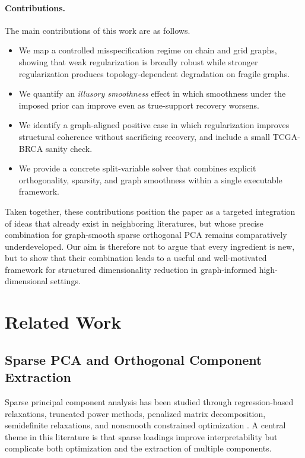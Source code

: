 \documentclass[10pt,twocolumn,letterpaper]{article}
\theoremstyle{definition}
\begin{document}
\paragraph{Contributions.}
The main contributions of this work are as follows.
\begin{itemize}[leftmargin=*]
    \item We map a controlled misspecification regime on chain and grid graphs, showing that weak regularization is broadly robust while stronger regularization produces topology-dependent degradation on fragile graphs.
    \item We quantify an \emph{illusory smoothness} effect in which smoothness under the imposed prior can improve even as true-support recovery worsens.
    \item We identify a graph-aligned positive case in which regularization improves structural coherence without sacrificing recovery, and include a small TCGA-BRCA sanity check.
    \item We provide a concrete split-variable solver that combines explicit orthogonality, sparsity, and graph smoothness within a single executable framework.
\end{itemize}

Taken together, these contributions position the paper as a targeted integration of ideas that already exist in neighboring literatures, but whose precise combination for graph-smooth sparse orthogonal PCA remains comparatively underdeveloped. Our aim is therefore not to argue that every ingredient is new, but to show that their combination leads to a useful and well-motivated framework for structured dimensionality reduction in graph-informed high-dimensional settings.

\section{Related Work}
\label{sec:related}

\subsection{Sparse PCA and Orthogonal Component Extraction}
Sparse principal component analysis has been studied through regression-based relaxations, truncated power methods, penalized matrix decomposition, semidefinite relaxations, and nonsmooth constrained optimization \cite{zou2006spca,witten2009pmd,daspremont2007dspca,journee2010gpower,qiu2023gradientspca}. A central theme in this literature is that sparse loadings improve interpretability but complicate both optimization and the extraction of multiple components.
\end{document}
